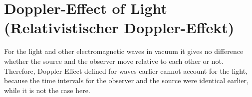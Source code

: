 \documentclass{report}
\begin{document}
\section{Doppler-Effect of Light (Relativistischer Doppler-Effekt)}
For the light and other electromagnetic waves in vacuum it gives no difference whether the source and the observer move relative to each other or not. Therefore, Doppler-Effect defined for waves earlier cannot account for the light, because the time intervals for the observer and the source were identical earlier, while it is not the case here.
\end{document}
